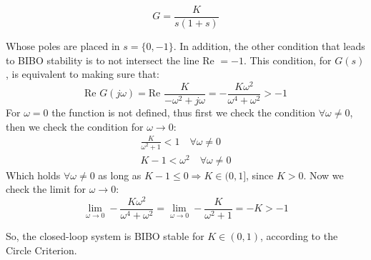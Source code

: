 $$ G = \frac{K}{s(1+s)}$$

Whose poles are placed in $s = \{0,-1 \}$. In addition, the other condition that leads to BIBO stability is to not intersect the line Re $= -1$. This condition, for $G(s)$, is equivalent to making sure that:
$$
 \textrm{Re }G(j\omega) =\textrm{Re } \frac{K}{-\omega^2+j\omega}= -\frac{K\omega^2}{\omega^4+\omega^2} > -1$$
For $\omega = 0$ the function is not defined, thus first we check the condition  $\forall \omega \neq 0$, then we check the condition for $\omega \to 0$:
\begin{align*}
\frac{K}{\omega^2+1} < 1 \quad \forall \omega \neq 0\\
K-1 < \omega^2 \quad \forall \omega \neq 0
\end{align*}
Which holds $\forall \omega \neq 0$ as long as $K-1 \leq 0 \Rightarrow K \in (0,1]$, since $K>0$. Now we check  the limit for $\omega \to 0$:
$$\lim_{\omega \to 0}-\frac{K\omega^2}{\omega^4+\omega^2}= \lim_{\omega \to 0}-\frac{K}{\omega^2+1}  =-K>-1$$


So, the closed-loop system is BIBO stable for $K \in (0, 1)$, according to the Circle Criterion.
